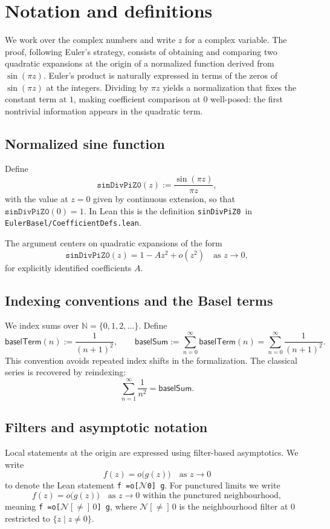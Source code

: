 \documentclass[11pt,a4paper]{article}
\theoremstyle{plain}
\theoremstyle{definition}
\DeclareRobustCommand{\codepath}[1]{\nolinkurl{#1}}
\newcommand{\nhds}{\ensuremath{\mathcal{N}}}
\newcommand{\nhdsPunct}[1]{\ensuremath{\mathcal{N}[{\neq}]\,#1}}
\DeclareRobustCommand{\leanid}[1]{\texttt{#1}}
\DeclareRobustCommand{\codepath}[1]{\nolinkurl{#1}}
\newcommand{\baselSum}{\ensuremath{\mathsf{baselSum}}}
\newcommand{\baselTerm}{\ensuremath{\mathsf{baselTerm}}}
\newcommand{\sinDivPiZZero}{\leanid{sinDivPiZ0}}
\begin{document}
\section{Notation and definitions}

We work over the complex numbers and write $z$ for a complex variable. 
The proof, following Euler’s strategy, consists of obtaining and comparing two quadratic expansions at the origin of a normalized function derived from $\sin(\pi z)$. Euler’s product is naturally expressed in terms of the zeros of $\sin(\pi z)$ at the integers. Dividing by $\pi z$ yields a normalization that fixes the constant term at $1$, making coefficient comparison at $0$ well-posed: the first nontrivial information appears in the quadratic term.

\subsection{Normalized sine function}

Define
\[
\sinDivPiZZero(z) := \frac{\sin(\pi z)}{\pi z},
\]
with the value at $z = 0$ given by continuous extension, so that $\sinDivPiZZero(0) = 1$. In Lean this is the definition \sinDivPiZZero\ in \codepath{EulerBasel/CoefficientDefs.lean}.

The argument centers on quadratic expansions of the form
\[
\sinDivPiZZero(z) = 1 - A z^{2} + o(z^{2})
\quad \text{as } z \to 0,
\]
for explicitly identified coefficients $A$.

\subsection{Indexing conventions and the Basel terms}

We index sums over $\mathbb{N} = \{0,1,2,\dots\}$. Define
\[
\baselTerm(n) := \frac{1}{(n+1)^{2}},
\qquad
\baselSum := \sum_{n=0}^{\infty} \baselTerm(n)
= \sum_{n=0}^{\infty} \frac{1}{(n+1)^{2}}.
\]
This convention avoids repeated index shifts in the formalization. The classical series is recovered by reindexing:
\[
\sum_{n=1}^{\infty} \frac{1}{n^{2}} = \baselSum.
\]

\subsection{Filters and asymptotic notation}

Local statements at the origin are expressed using filter-based asymptotics. We write
\[
f(z) = o\bigl(g(z)\bigr)
\quad \text{as } z \to 0
\]
to denote the Lean statement \texttt{f =o[\nhds 0] g}. For punctured limits we write
\[
f(z) = o\bigl(g(z)\bigr)
\quad \text{as } z \to 0 \text{ within the punctured neighbourhood},
\]
meaning \texttt{f =o[\nhdsPunct{0}] g}, where $\nhdsPunct{0}$ is the neighbourhood filter at $0$ restricted to $\{z \mid z \neq 0\}$.
\end{document}
